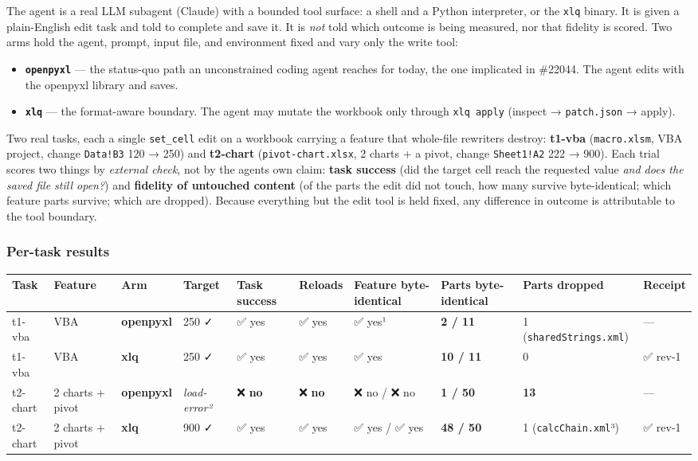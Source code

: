 \documentclass[
]{article}
\newcounter{none} %
\providecommand{\tightlist}{%
  \setlength{\itemsep}{0pt}\setlength{\parskip}{0pt}}
\begin{document}
The agent is a real LLM subagent (Claude) with a bounded tool surface: a
shell and a Python interpreter, or the \texttt{xlq} binary. It is given
a plain-English edit task and told to complete and save it. It is
\emph{not} told which outcome is being measured, nor that fidelity is
scored. Two arms hold the agent, prompt, input file, and environment
fixed and vary only the write tool:

\begin{itemize}
\tightlist
\item
  \textbf{\texttt{openpyxl}} --- the status-quo path an unconstrained
  coding agent reaches for today, the one implicated in \#22044. The
  agent edits with the openpyxl library and saves.
\item
  \textbf{\texttt{xlq}} --- the format-aware boundary. The agent may
  mutate the workbook only through \texttt{xlq\ apply} (inspect →
  \texttt{patch.json} → apply).
\end{itemize}

Two real tasks, each a single \texttt{set\_cell} edit on a workbook
carrying a feature that whole-file rewriters destroy: \textbf{t1-vba}
(\texttt{macro.xlsm}, VBA project, change \texttt{Data!B3} 120 → 250)
and \textbf{t2-chart} (\texttt{pivot-chart.xlsx}, 2 charts + a pivot,
change \texttt{Sheet1!A2} 222 → 900). Each trial scores two things by
\emph{external check}, not by the agent\textquotesingle s own claim:
\textbf{task success} (did the target cell reach the requested value
\emph{and does the saved file still open?}) and \textbf{fidelity of
untouched content} (of the parts the edit did not touch, how many
survive byte-identical; which feature parts survive; which are dropped).
Because everything but the edit tool is held fixed, any difference in
outcome is attributable to the tool boundary.

\subsubsection{Per-task results}\label{per-task-results}

{\def\LTcaptype{none} %
\begin{longtable}[]{@{}llllllllll@{}}
\toprule\noalign{}
Task & Feature & Arm & Target & Task success & Reloads & Feature
byte-identical & Parts byte-identical & Parts dropped & Receipt \\
\midrule\noalign{}
\endhead
\bottomrule\noalign{}
\endlastfoot
t1-vba & VBA & \textbf{openpyxl} & 250 ✓ & ✅ yes & ✅ yes & ✅ yes¹ &
\textbf{2 / 11} & 1 (\texttt{sharedStrings.xml}) & --- \\
t1-vba & VBA & \textbf{xlq} & 250 ✓ & ✅ yes & ✅ yes & ✅ yes &
\textbf{10 / 11} & 0 & ✅ rev-1 \\
t2-chart & 2 charts + pivot & \textbf{openpyxl} & \emph{load-error²} &
❌ \textbf{no} & ❌ \textbf{no} & ❌ no / ❌ no & \textbf{1 / 50} &
\textbf{13} & --- \\
t2-chart & 2 charts + pivot & \textbf{xlq} & 900 ✓ & ✅ yes & ✅ yes &
✅ yes / ✅ yes & \textbf{48 / 50} & 1 (\texttt{calcChain.xml}³) & ✅
rev-1 \\
\end{longtable}
}
\end{document}
